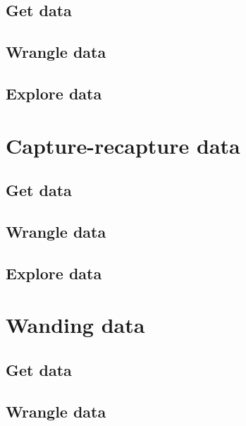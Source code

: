 \documentclass[
]{book}
\begin{document}
\hypertarget{get-data}{%
\subsection{Get data}\label{get-data}}

\hypertarget{wrangle-data}{%
\subsection{Wrangle data}\label{wrangle-data}}

\hypertarget{explore-data}{%
\subsection{Explore data}\label{explore-data}}

\hypertarget{dataCMR}{%
\section{Capture-recapture data}\label{dataCMR}}

\hypertarget{get-data-1}{%
\subsection{Get data}\label{get-data-1}}

\hypertarget{wrangle-data-1}{%
\subsection{Wrangle data}\label{wrangle-data-1}}

\hypertarget{explore-data-1}{%
\subsection{Explore data}\label{explore-data-1}}

\hypertarget{dataWanding}{%
\section{Wanding data}\label{dataWanding}}

\hypertarget{get-data-2}{%
\subsection{Get data}\label{get-data-2}}

\hypertarget{wrangle-data-2}{%
\subsection{Wrangle data}\label{wrangle-data-2}}
\end{document}
